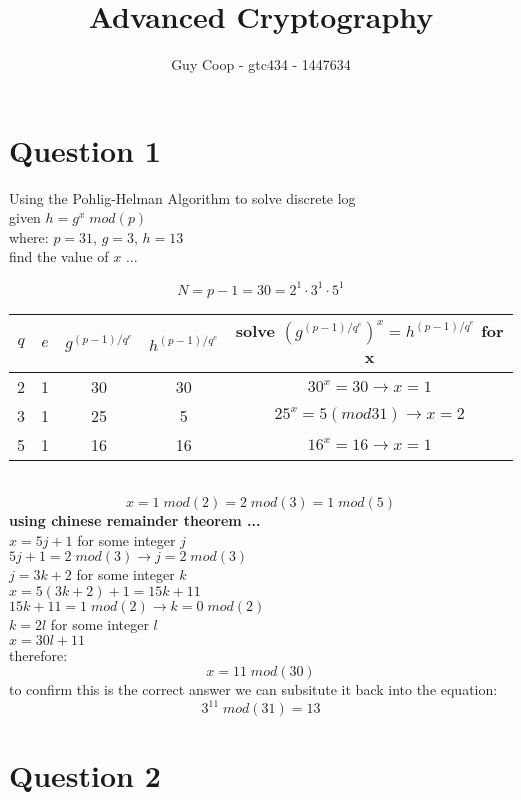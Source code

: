 \documentclass[10pt]{article}
\title{Advanced Cryptography}
\author{Guy Coop - gtc434 - 1447634}
\begin{document}
\maketitle
\section*{Question 1}
Using the Pohlig-Helman Algorithm to solve discrete log \\
given $h = g^x \; mod(p)$\\
where: $p = 31$, $g = 3$, $h = 13$ \\
find the value of $x$ ... \\
\begin{center}
$$N = p-1 = 30 = 2^1 \cdot 3^1 \cdot 5^1$$
\begin{tabular}{c | c | c | c | c}
$q$ & $e$ & $g^{(p-1)/q^e}$ & $h^{(p-1)/q^e}$ & solve $(g^{(p-1)/q^e})^{x} = h^{(p-1)/q^e}$ for x \\
\hline
2 & 1 & 30 & 30 & $30^x = 30 \rightarrow x = 1$ \\ 
3 & 1 & 25 & 5 & $25^x = 5 (mod 31) \rightarrow x = 2$ \\
5 & 1 & 16 & 16 & $16^x = 16 \rightarrow x = 1$\\
\end{tabular}\\
$$ x = 1 \; mod(2) = 2 \; mod(3) = 1 \; mod(5)$$
{\bf using chinese remainder theorem ...}\\
$x = 5j + 1$ for some integer $j$ \\
$5j + 1 = 2 \; mod(3) \rightarrow j = 2 \; mod(3)$ \\
$j = 3k + 2$ for some integer $k$ \\
$x = 5(3k + 2) + 1 = 15k + 11$\\
$15k + 11 = 1 \; mod(2) \rightarrow k = 0 \; mod(2)$ \\
$k = 2l$ for some integer $l$ \\
$x = 30l + 11$ \\
therefore: 
$$x = 11 \; mod(30)$$
to confirm this is the correct answer we can subsitute it back into the equation:
$$3^{11} \; mod(31) = 13$$
\end{center}
\newpage
\section*{Question 2}
\end{document}
